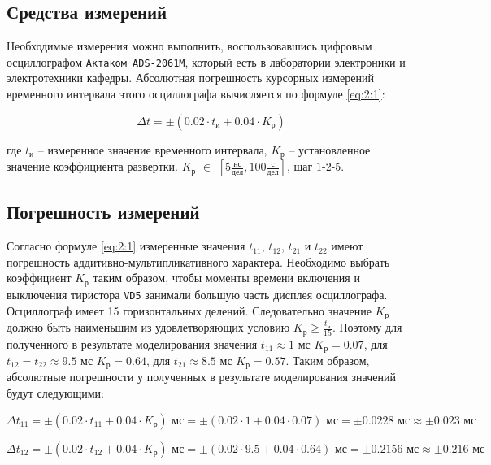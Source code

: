 \subsection{Средства измерений}

Необходимые измерения можно выполнить, воспользовавшись цифровым осциллографом \verb+Актаком ADS-2061M+, который есть в лаборатории электроники и электротехники кафедры. Абсолютная погрешность курсорных измерений временного интервала этого осциллографа вычисляется по формуле \ref{eq:2:1}:

\begin{equation}
\label{eq:2:1}
	\Delta t = \pm \left(0.02 \cdot t_{\text{и}} + 0.04 \cdot K_{\text{р}} \right)
\end{equation}

\noindent где $t_{\text{и}}$ -- измеренное значение временного интервала, $K_{\text{р}}$ -- установленное значение коэффициента развертки. $K_{\text{р}}$ $\in$ $\left[5 \frac{\text{нс}}{\text{дел}} , 100 \frac{\text{с}}{\text{дел}}\right]$, шаг $1$-$2$-$5$.

\subsection{Погрешность измерений}

Согласно формуле \ref{eq:2:1} измеренные значения $t_{11}$, $t_{12}$, $t_{21}$ и $t_{22}$ имеют погрешность аддитивно-мультипликативного характера. Необходимо выбрать коэффициент $K_{\text{р}}$ таким образом, чтобы моменты времени включения и выключения тиристора \verb+VD5+ занимали большую часть дисплея осциллографа. Осциллограф имеет 15 горизонтальных делений. Следовательно значение $K_{\text{р}}$ должно быть наименьшим из удовлетворяющих условию $K_{\text{р}} \geq \frac{t_{\text{и}}}{15}$. Поэтому для полученного в результате моделирования значения $t_{11} \approx 1$ мс $K_{\text{р}} = 0.07$, для $t_{12} = t_{22} \approx 9.5$ мс $K_{\text{р}} = 0.64$, для $t_{21} \approx 8.5$ мс $K_{\text{р}} = 0.57$.
Таким образом, абсолютные погрешности у полученных в результате моделирования значений будут следующими:

\begin{displaymath}
	\Delta t_{11} = \pm \left( 0.02 \cdot t_{11} + 0.04 \cdot K_{\text{р}} \right) \text{ мс} = \pm \left( 0.02 \cdot 1 + 0.04 \cdot 0.07 \right) \text{ мс} = \pm 0.0228 \text{ мс} \approx \pm 0.023 \text{ мс}  
\end{displaymath}

\begin{displaymath}
	\Delta t_{12} = \pm \left( 0.02 \cdot t_{12} + 0.04 \cdot K_{\text{р}} \right) \text{ мс} = \pm \left( 0.02 \cdot 9.5 + 0.04 \cdot 0.64 \right) \text{ мс} = \pm 0.2156 \text{ мс} \approx \pm 0.216 \text{ мс}  
\end{displaymath}

